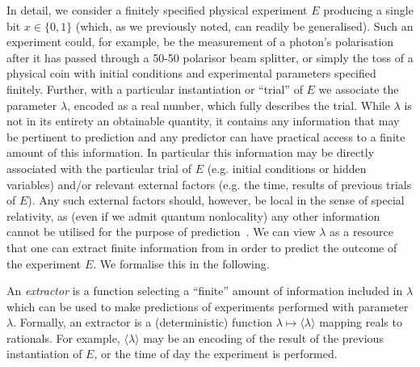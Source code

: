 \documentclass[%
 superscriptaddress,
 preprint,
 showpacs,
 showkeys,
 preprintnumbers,
  amsmath,amssymb,
  aps,
 pra,
  longbibliography,
  floatfix,
 ]{revtex4-1}
\theoremstyle{definition}
\begin{document}
In detail, we consider a finitely specified physical experiment $E$ producing a single bit $x\in\{0,1\}$ (which, as we previously noted, can readily be generalised).
Such an experiment could, for example, be the measurement of a photon's polarisation after it has passed through a 50-50 {\color{green} polarisor} beam splitter, or simply the toss of a physical coin with initial conditions and experimental parameters specified finitely.
Further, with a particular instantiation or ``trial'' of $E$ we associate the parameter $\lambda$, encoded as a real number,  which fully describes the trial.
While $\lambda$ is not in its entirety an obtainable quantity, it contains any information that may be pertinent to prediction and any predictor can have practical access to a finite amount of this information.
In particular this information may be   directly associated with the particular trial of $E$ (e.g. initial conditions or hidden variables) %
and/or relevant external factors (e.g. the time, results of previous trials of $E$).
Any such external factors should, however, be local in the sense of special relativity, as (even if we admit quantum nonlocality) any other information cannot be utilised for the purpose of prediction~\cite{laloe-2012}.
We can view $\lambda$ as a resource that one can extract finite information from in order   to predict the outcome of the experiment $E$.
We formalise this in the following.

An {\em extractor} is a function selecting a ``finite'' amount of information included in $\lambda$
which can be used to make predictions of experiments performed with parameter $\lambda$. Formally, an extractor is a (deterministic)
function $\lambda \mapsto \langle \lambda \rangle$ mapping reals to rationals.
For example, $\langle \lambda \rangle$ may be an encoding of the result of the previous instantiation of $E$, or the time of day the experiment is performed.
\end{document}
